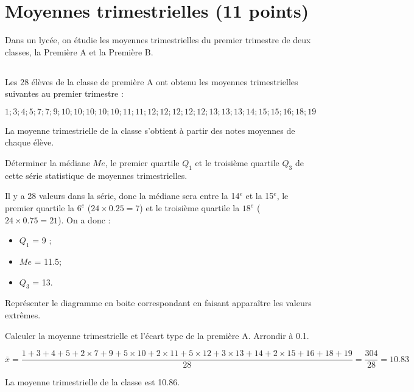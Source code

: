 \section{Moyennes trimestrielles (11 points)}

Dans un lycée, on étudie les moyennes trimestrielles du premier trimestre de deux classes, la Première A et la Première B.

\subsection{}
Les 28 élèves de la classe de première A ont obtenu les moyennes trimestrielles suivantes au premier trimestre :

\begin{equation*}
1 ; 3 ; 4 ; 5 ; 7 ; 7 ; 9 ; 10 ; 10 ; 10 ; 10 ; 10 ; 11 ;  11 ; 12 ; 12 ; 12 ; 12 ; 12 ; 13 ; 13 ; 13 ; 14 ; 15 ; 15 ; 16 ; 18 ; 19
\end{equation*}

La moyenne trimestrielle de la classe s'obtient à partir des notes moyennes de chaque élève.

\begin{questions}
	\question[2] Déterminer la médiane $Me$, le premier quartile $Q_1$ et le troisième quartile $Q_3$ de cette série statistique de moyennes trimestrielles.
	\begin{solution}
		Il y a 28 valeurs dans la série, donc la médiane sera entre la 14$^e$ et la 15$^e$, le premier quartile la $6^e$ ($24 \times \num{0.25} = 7$) et le troisième quartile la $18^e$ ($24 \times \num{0.75} = 21$). On a donc :
		
		\begin{itemize}
			\item $Q_1 $ = 9 ;
			\item $Me$ = \num{11.5};
			\item $Q_3$ = 13.
		\end{itemize} 
	\end{solution}
	
	\question[1] Représenter le diagramme en boite correspondant en faisant apparaître les valeurs extrêmes.
	
	\question[1] Calculer la moyenne trimestrielle et l'écart type de la première A. Arrondir à \num{0.1}.
	\begin{solution}
		\begin{equation*}
			\bar{x} = \dfrac{1 + 3 + 4 + 5 + 2 \times 7 + 9 + 5 \times 10 + 2 \times 11 + 5 \times 12 + 3 \times 13 + 14 + 2 \times 15 + 16 + 18 + 19 }{28} = \dfrac{304}{28} = \num{10.83}
		\end{equation*}
		
		La moyenne trimestrielle de la classe est \num{10.86}.
	\end{solution}
\end{questions}

